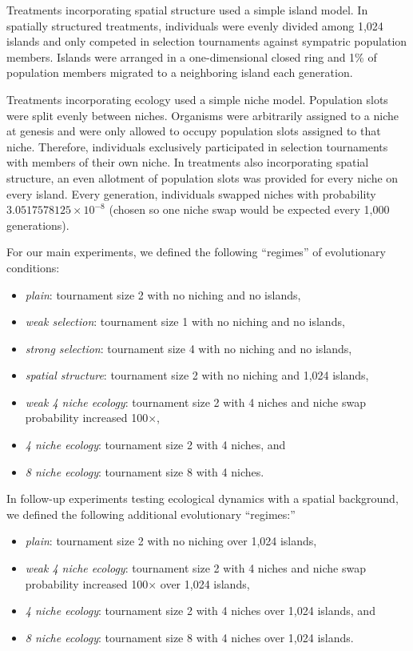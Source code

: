 Treatments incorporating spatial structure used a simple island model.
In spatially structured treatments, individuals were evenly divided among 1,024 islands and only competed in selection tournaments against sympatric population members.
Islands were arranged in a one-dimensional closed ring and 1\% of population members migrated to a neighboring island each generation.

Treatments incorporating ecology used a simple niche model.
Population slots were split evenly between niches.
Organisms were arbitrarily assigned to a niche at genesis and were only allowed to occupy population slots assigned to that niche.
Therefore, individuals exclusively participated in selection tournaments with members of their own niche.
In treatments also incorporating spatial structure, an even allotment of population slots was provided for every niche on every island.
Every generation, individuals swapped niches with probability $3.0517578125 \times 10^{-8}$ (chosen so one niche swap would be expected every 1,000 generations).

For our main experiments, we defined the following ``regimes'' of evolutionary conditions:
\begin{itemize}
  \item \textit{plain}: tournament size 2 with no niching and no islands,
  \item \textit{weak selection}: tournament size 1 with no niching and no islands,
  \item \textit{strong selection}: tournament size 4 with no niching and no islands,
  \item \textit{spatial structure}: tournament size 2 with no niching and 1,024 islands,
  \item \textit{weak 4 niche ecology}: tournament size 2 with 4 niches and niche swap probability increased 100$\times$,
  \item \textit{4 niche ecology}: tournament size 2 with 4 niches, and
  \item \textit{8 niche ecology}: tournament size 8 with 4 niches.
\end{itemize}

In follow-up experiments testing ecological dynamics with a spatial background, we defined the following additional evolutionary ``regimes:''
\begin{itemize}
  \item \textit{plain}: tournament size 2 with no niching over 1,024 islands,
  \item \textit{weak 4 niche ecology}: tournament size 2 with 4 niches and niche swap probability increased 100$\times$ over 1,024 islands,
  \item \textit{4 niche ecology}: tournament size 2 with 4 niches over 1,024 islands, and
  \item \textit{8 niche ecology}: tournament size 8 with 4 niches over 1,024 islands.
\end{itemize}

